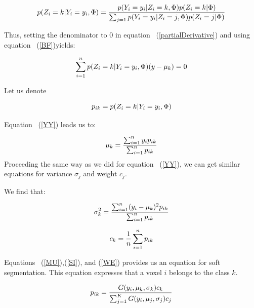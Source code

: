   \begin{equation}\label{BF}
  p(Z_i=k|Y_i=y_i,\Phi)= \frac{p(Y_i=y_i|Z_i=k,\Phi)p(Z_i=k|\Phi)}{\sum_{j=1} p(Y_i=y_i|Z_i=j,\Phi)p(Z_i=j|\Phi)}\\
  \end{equation}

Thus, setting the denominator to 0 in equation ~(\ref{partialDerivative}) and using equation ~(\ref{BF})yields:
 
  \begin{equation}\label{YY}
  \sum_{i=1}^n p(Z_i=k|Y_i=y_i,\Phi)(y-\mu_k)=0\\
  \end{equation}

Let us denote

  \begin{equation}%
  p_{ik}=p(Z_i=k|Y_i=y_i,\Phi)\\
  \end{equation}

Equation ~(\ref{YY}) leads us to:
 
  \begin{equation}\label{MU}
  \mu_k = \frac{\sum_{i=1}^n y_ip_{ik}}{\sum_{i=1}^n p_{ik}}\\
  \end{equation}
Proceeding the same way as we did for equation ~(\ref{YY}), we can get similar equations for variance $\sigma_j$ and weight $c_j$. 

We find that:

  \begin{equation}\label{SI}
  \sigma_k^2 = \frac{\sum_{i=1}^n (y_i-\mu_k)^2p_{ik}}{\sum_{i=1}^n p_{ik}}\\
  \end{equation}
  
  \begin{equation}\label{WE}
  c_k = \frac{1}{n}\sum_{i=1}^n p_{ik}\\
  \end{equation}

\par
Equations ~(\ref{MU}),(\ref{SI}), and (\ref{WE}) provides us an equation for soft segmentation. This equation expresses that a voxel $i$ belongs to the class $k$.
  
  \begin{equation}\label{SS}
  p_{ik}= \frac{G(y_i,\mu_k,\sigma_k)c_k}{\sum_{j=1}^K G(y_i,\mu_j,\sigma_j)c_j}\\
  \end{equation}

